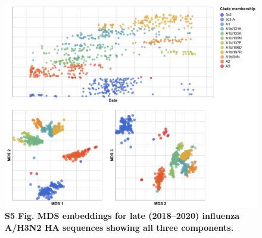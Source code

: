 \documentclass[10pt,letterpaper]{article}
\begin{document}
\begin{figure}[!h]
\includegraphics[width=\columnwidth]{figures/flu-2018-2020-mds-by-clade.png}
\caption*{{\bf S5 Fig. MDS embeddings for late (2018--2020) influenza A/H3N2 HA sequences showing all three components.}}
\end{figure}
\end{document}

